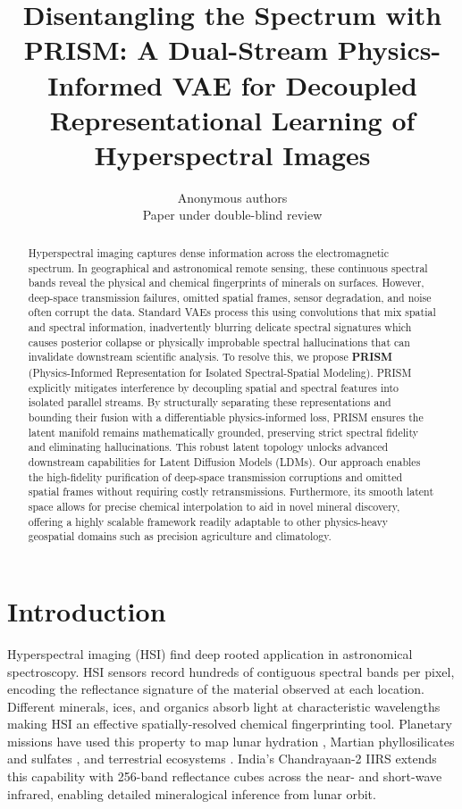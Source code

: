\documentclass{article} %
\title{Disentangling the Spectrum with PRISM: A Dual-Stream Physics-Informed VAE for Decoupled Representational Learning of Hyperspectral Images}
\author{Anonymous authors \\ Paper under double-blind review}
\begin{document}
\maketitle

\begin{abstract}
Hyperspectral imaging captures dense information across the electromagnetic spectrum. In geographical and astronomical remote sensing, these continuous spectral bands reveal the physical and chemical fingerprints of minerals on surfaces. However, deep-space transmission failures, omitted spatial frames, sensor degradation, and noise often corrupt the data. Standard VAEs process this using convolutions that mix spatial and spectral information, inadvertently blurring delicate spectral signatures which causes posterior collapse or physically improbable spectral hallucinations that can invalidate downstream scientific analysis. To resolve this, we propose \textbf{PRISM} (Physics-Informed Representation for Isolated Spectral-Spatial Modeling). PRISM explicitly mitigates interference by decoupling spatial and spectral features into isolated parallel streams. By structurally separating these representations and bounding their fusion with a differentiable physics-informed loss, PRISM ensures the latent manifold remains mathematically grounded, preserving strict spectral fidelity and eliminating hallucinations. This robust latent topology unlocks advanced downstream capabilities for Latent Diffusion Models (LDMs). Our approach enables the high-fidelity purification of deep-space transmission corruptions and omitted spatial frames without requiring costly retransmissions. Furthermore, its smooth latent space allows for precise chemical interpolation to aid in novel mineral discovery, offering a highly scalable framework readily adaptable to other physics-heavy geospatial domains such as precision agriculture and climatology.
\end{abstract}

\section{Introduction}

Hyperspectral imaging (HSI) find deep rooted application in astronomical spectroscopy. HSI sensors record hundreds of contiguous spectral bands per pixel, encoding the reflectance signature of the material observed at each location. Different minerals, ices, and organics absorb light at characteristic wavelengths making HSI an effective spatially-resolved chemical fingerprinting tool. Planetary missions have used this property to map lunar hydration \citep{pieters2009m3}, Martian phyllosilicates and sulfates \citep{murchie2007crism}, and terrestrial ecosystems \citep{green1998aviris}. India's Chandrayaan-2 IIRS \citep{chowdhury2020iirs} extends this capability with 256-band reflectance cubes across the near- and short-wave infrared, enabling detailed mineralogical inference from lunar orbit.
\end{document}
